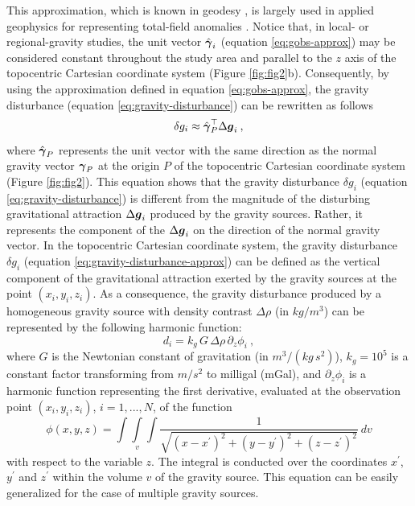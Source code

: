\documentclass[extra]{gji}
\begin{document}
This approximation, which is known in geodesy \citep[e.g.,][]{sanso_sideris2013},
is largely used in applied geophysics for representing
total-field anomalies \citep[e.g.,][]{blakely1996}.
Notice that, in local- or regional-gravity studies, the unit
vector $\hat{\mitbf{\gamma}}_{i}$ (equation \ref{eq:gobs-approx}) 
may be considered constant throughout the study area and 
parallel to the $z$ axis of the topocentric Cartesian coordinate 
system (Figure \ref{fig:fig2}b).
Consequently, by using the approximation defined in equation 
\ref{eq:gobs-approx}, the gravity disturbance 
(equation \ref{eq:gravity-disturbance}) can be rewritten as 
follows 
\begin{equation}
\delta g_{i} \approx \hat{\mitbf{\gamma}}_{P}^{\top} \Delta \mitbf{g}_{i} \: ,
\label{eq:gravity-disturbance-approx}
\end{equation}
where $\hat{\mitbf{\gamma}}_{P}$ represents the unit vector with
the same direction as the normal gravity vector $\mitbf{\gamma}_{P}$
at the origin $P$ of the topocentric Cartesian coordinate system
(Figure \ref{fig:fig2}).
This equation shows that the gravity disturbance $\delta g_{i}$ (equation \ref{eq:gravity-disturbance}) is different from the magnitude
of the disturbing gravitational attraction $\Delta \mitbf{g}_{i}$
produced by the gravity sources. Rather, it represents the 
component of the $\Delta \mitbf{g}_{i}$ on the direction of the normal
gravity vector. In the topocentric Cartesian coordinate system,
the gravity disturbance $\delta g_{i}$ (equation \ref{eq:gravity-disturbance-approx})
can be defined as the vertical component of the gravitational attraction exerted by
the gravity sources at the point $(x_{i}, y_{i}, z_{i})$.
As a consequence, the gravity disturbance produced by
a homogeneous gravity source with density contrast $\Delta\rho$
(in $kg / m^{3}$) can be represented by the following harmonic function:
\begin{equation}
d_{i} = k_{g} \, G \, \Delta\rho \, \partial_{z} \phi_{i} \: ,
\label{eq:gz-local}
\end{equation}
where $G$ is the Newtonian constant of gravitation
(in $m^{3} / (kg \, s^{2})$),
$k_{g} = 10^{5}$ is a constant factor
transforming from $m/s^{2}$ to milligal (mGal),
and $\partial_{z} \phi_{i}$ is a harmonic function representing the first 
derivative, evaluated at the observation point $(x_{i},y_{i},z_{i})$, 
$i = 1, ..., N$, of the function 
\begin{equation}
\phi(x,y,z) = \int\int\limits_{v}\int \frac{1}{\sqrt{(x - x^{\prime})^{2} + 
(y - y^{\prime})^{2} + (z - z^{\prime})^{2}}} \: dv
\label{eq:phi}
\end{equation}
with respect to the variable $z$. The 
integral is conducted over the coordinates $x^{\prime}$, $y^{\prime}$ 
and $z^{\prime}$ within the volume $v$ of the gravity source.
This equation can be easily generalized for the case
of multiple gravity sources.
\end{document}
